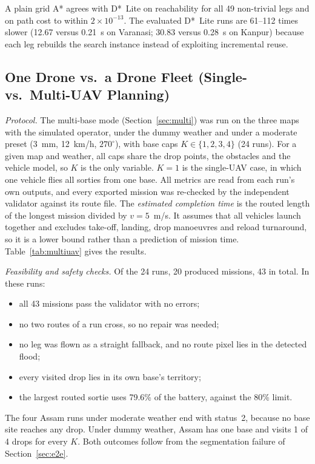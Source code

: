 A plain grid A* \cite{hart1968formal} agrees with D*~Lite on reachability for all 49 non-trivial legs and on path cost to within $2\times10^{-13}$. The evaluated D*~Lite runs are 61--112 times slower (12.67 versus 0.21~s on Varanasi; 30.83 versus 0.28~s on Kanpur) because each leg rebuilds the search instance instead of exploiting incremental reuse.



\subsection{One Drone vs.\ a Drone Fleet (Single- vs.\ Multi-UAV Planning)}
\label{sec:multires}
\emph{Protocol.} The multi-base mode (Section~\ref{sec:multi}) was run on the three maps with the simulated operator, under the dummy weather and under a moderate preset (3~mm, 12~km/h, $270^\circ$), with base caps $K\in\{1,2,3,4\}$ (24 runs). For a given map and weather, all caps share the drop points, the obstacles and the vehicle model, so $K$ is the only variable. $K=1$ is the single-UAV case, in which one vehicle flies all sorties from one base. All metrics are read from each run's own outputs, and every exported mission was re-checked by the independent validator against its route file. The \emph{estimated completion time} is the routed length of the longest mission divided by $v=5$~m/s. It assumes that all vehicles launch together and excludes take-off, landing, drop manoeuvres and reload turnaround, so it is a lower bound rather than a prediction of mission time. Table~\ref{tab:multiuav} gives the results.



\emph{Feasibility and safety checks.} Of the 24 runs, 20 produced missions, 43 in total. In these runs:
\begin{itemize}
\item all 43 missions pass the validator with no errors;
\item no two routes of a run cross, so no repair was needed;
\item no leg was flown as a straight fallback, and no route pixel lies in the detected flood;
\item every visited drop lies in its own base's territory;
\item the largest routed sortie uses 79.6\% of the battery, against the 80\% limit.
\end{itemize}
The four Assam runs under moderate weather end with status~2, because no base site reaches any drop. Under dummy weather, Assam has one base and visits 1 of 4 drops for every $K$. Both outcomes follow from the segmentation failure of Section~\ref{sec:e2e}.

